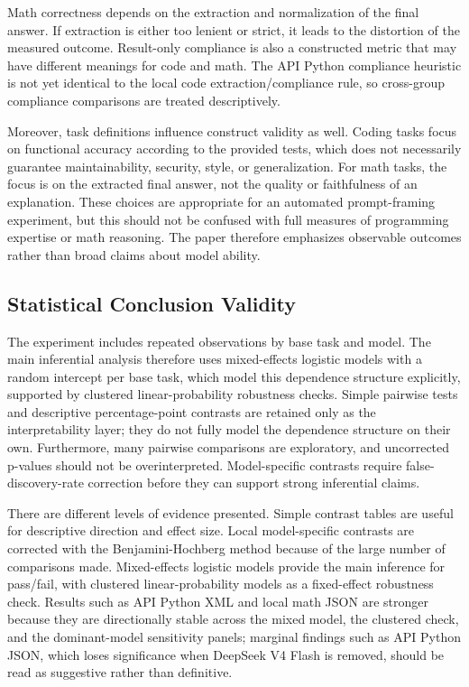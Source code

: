\documentclass{llncs}
\begin{document}
Math correctness depends on the extraction and normalization of the final answer. If extraction is either too lenient or strict, it leads to the distortion of the measured outcome. Result-only compliance is also a constructed metric that may have different meanings for code and math. The API Python compliance heuristic is not yet identical to the local code extraction/compliance rule, so cross-group compliance comparisons are treated descriptively.

Moreover, task definitions influence construct validity as well. Coding tasks focus on functional accuracy according to the provided tests, which does not necessarily guarantee maintainability, security, style, or generalization. For math tasks, the focus is on the extracted final answer, not the quality or faithfulness of an explanation. These choices are appropriate for an automated prompt-framing experiment, but this should not be confused with full measures of programming expertise or math reasoning. The paper therefore emphasizes observable outcomes rather than broad claims about model ability.

\subsection{Statistical Conclusion Validity}\label{statistical-conclusion-validity}

The experiment includes repeated observations by base task and model. The main inferential analysis therefore uses mixed-effects logistic models with a random intercept per base task, which model this dependence structure explicitly, supported by clustered linear-probability robustness checks. Simple pairwise tests and descriptive percentage-point contrasts are retained only as the interpretability layer; they do not fully model the dependence structure on their own. Furthermore, many pairwise comparisons are exploratory, and uncorrected p-values should not be overinterpreted. Model-specific contrasts require false-discovery-rate correction before they can support strong inferential claims.

There are different levels of evidence presented. Simple contrast tables are useful for descriptive direction and effect size. Local model-specific contrasts are corrected with the Benjamini-Hochberg method because of the large number of comparisons made. Mixed-effects logistic models provide the main inference for pass/fail, with clustered linear-probability models as a fixed-effect robustness check. Results such as API Python XML and local math JSON are stronger because they are directionally stable across the mixed model, the clustered check, and the dominant-model sensitivity panels; marginal findings such as API Python JSON, which loses significance when DeepSeek V4 Flash is removed, should be read as suggestive rather than definitive.
\end{document}

